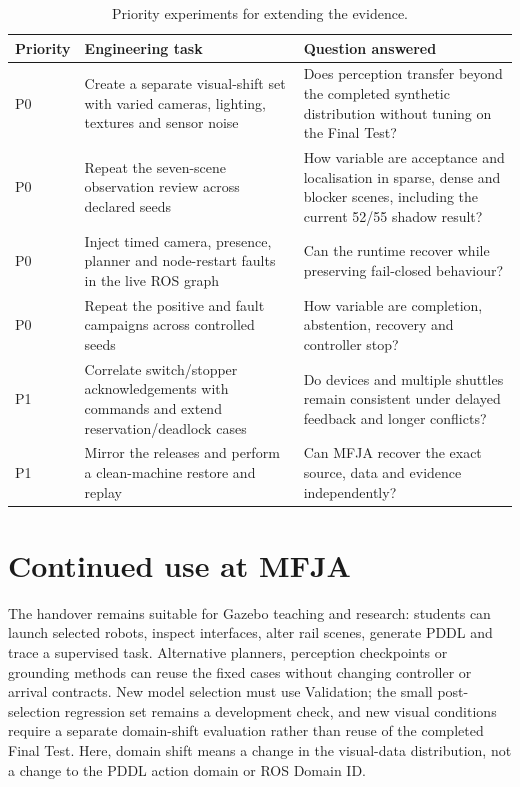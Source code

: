 \begin{table}[H]
\centering
\small
\renewcommand{\arraystretch}{1.08}
\caption{Priority experiments for extending the evidence.}
\label{tab:remaining-plan}
\begin{tabularx}{\textwidth}{@{}p{}p{}X@{}}
\toprule
\textbf{Priority} & \textbf{Engineering task} & \textbf{Question answered}\\
\midrule
P0 & Create a separate visual-shift set with varied cameras, lighting, textures
and sensor noise & Does perception transfer beyond the completed synthetic
distribution without tuning on the Final Test?\\
\tablerowrule
P0 & Repeat the seven-scene observation review across declared seeds & How
variable are acceptance and localisation in sparse, dense and blocker scenes,
including the current 52/55 shadow result?\\
\tablerowrule
P0 & Inject timed camera, presence, planner and node-restart faults in the live
ROS graph & Can the runtime recover while preserving fail-closed behaviour?\\
\tablerowrule
P0 & Repeat the positive and fault campaigns across controlled seeds & How
variable are completion, abstention, recovery and controller stop?\\
\tablerowrule
P1 & Correlate switch/stopper acknowledgements with commands and extend
reservation/deadlock cases & Do devices and multiple shuttles remain consistent
under delayed feedback and longer conflicts?\\
\tablerowrule
P1 & Mirror the releases and perform a clean-machine restore and replay & Can
MFJA recover the exact source, data and evidence independently?\\
\bottomrule
\end{tabularx}
\end{table}

\section{Continued use at MFJA}

The handover remains suitable for Gazebo teaching and research: students can
launch selected robots, inspect interfaces, alter rail scenes, generate PDDL
and trace a supervised task. Alternative planners, perception checkpoints or
grounding methods can reuse the fixed cases without changing controller or
arrival contracts. New model selection must use Validation; the small
post-selection regression set remains a development check, and new visual
conditions require a separate domain-shift evaluation rather than reuse of the
completed Final Test. Here, domain shift means a change in the visual-data
distribution, not a change to the PDDL action domain or ROS Domain ID.

